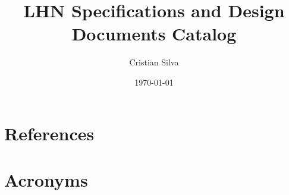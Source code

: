 \documentclass[PMO,authoryear,toc]{lsstdoc}
\title{LHN Specifications and Design Documents Catalog}
\author{%
Cristian Silva
}
\date{\today}
\begin{document}
\maketitle



\appendix
\section{References} \label{sec:bib}
\renewcommand{\refname}{} %


\section{Acronyms} \label{sec:acronyms}

\end{document}
